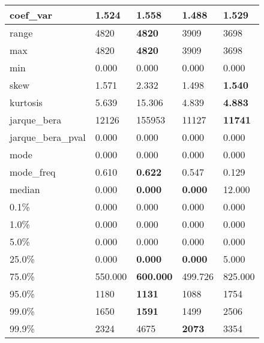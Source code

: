 \begin{table}[H]
\begin{tabular}{|l|m{10em}|m{10em}|m{10em}|m{10em}|}
\hline coef\_var & 1.524 & 1.558 & \cellcolor[rgb]{0.9, 0.54, 0.52} 1.488 & \bfseries 1.529 \\
\hline range & 4820 & \bfseries 4820 & 3909 & \cellcolor[rgb]{0.9, 0.54, 0.52} 3698 \\
\hline max & 4820 & \bfseries 4820 & 3909 & \cellcolor[rgb]{0.9, 0.54, 0.52} 3698 \\
\hline min & 0.000 & 0.000 & 0.000 & 0.000 \\
\hline skew & 1.571 & \cellcolor[rgb]{0.9, 0.54, 0.52} 2.332 & 1.498 & \bfseries 1.540 \\
\hline kurtosis & 5.639 & \cellcolor[rgb]{0.9, 0.54, 0.52} 15.306 & 4.839 & \bfseries 4.883 \\
\hline jarque\_bera & 12126 & \cellcolor[rgb]{0.9, 0.54, 0.52} 155953 & 11127 & \bfseries 11741 \\
\hline jarque\_bera\_pval & 0.000 & 0.000 & 0.000 & 0.000 \\
\hline mode & 0.000 & 0.000 & 0.000 & 0.000 \\
\hline mode\_freq & 0.610 & \bfseries 0.622 & 0.547 & \cellcolor[rgb]{0.9, 0.54, 0.52} 0.129 \\
\hline median & 0.000 & \bfseries 0.000 & \bfseries 0.000 & \cellcolor[rgb]{0.9, 0.54, 0.52} 12.000 \\
\hline 0.1\% & 0.000 & 0.000 & 0.000 & 0.000 \\
\hline 1.0\% & 0.000 & 0.000 & 0.000 & 0.000 \\
\hline 5.0\% & 0.000 & 0.000 & 0.000 & 0.000 \\
\hline 25.0\% & 0.000 & \bfseries 0.000 & \bfseries 0.000 & \cellcolor[rgb]{0.9, 0.54, 0.52} 5.000 \\
\hline 75.0\% & 550.000 & \bfseries 600.000 & 499.726 & \cellcolor[rgb]{0.9, 0.54, 0.52} 825.000 \\
\hline 95.0\% & 1180 & \bfseries 1131 & 1088 & \cellcolor[rgb]{0.9, 0.54, 0.52} 1754 \\
\hline 99.0\% & 1650 & \bfseries 1591 & 1499 & \cellcolor[rgb]{0.9, 0.54, 0.52} 2506 \\
\hline 99.9\% & 2324 & \cellcolor[rgb]{0.9, 0.54, 0.52} 4675 & \bfseries 2073 & 3354 \\
\hline
\end{tabular}
\end{table}
